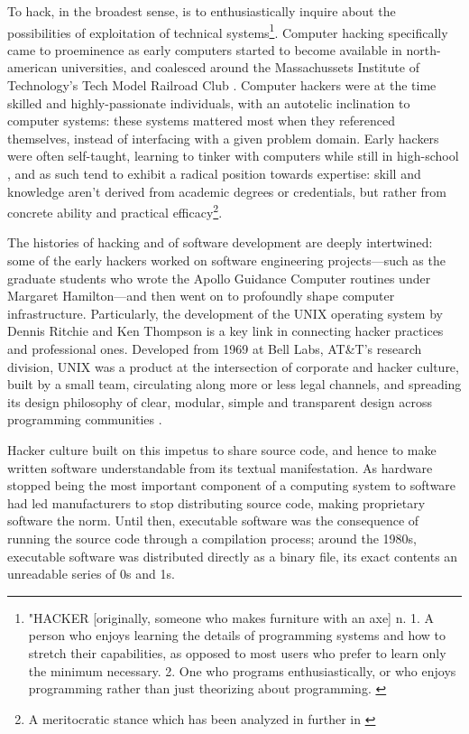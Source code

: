 To hack, in the broadest sense, is to enthusiastically inquire about the possibilities of exploitation of technical systems\footnote{"HACKER [originally, someone who makes furniture with an axe] n. 1. A person who enjoys learning the details of programming systems and how to stretch their capabilities, as opposed to most users who prefer to learn only the minimum necessary. 2. One who programs enthusiastically, or who enjoys programming rather than just theorizing about programming. \citep{dourish_original_1988}}. Computer hacking specifically came to proeminence as early computers started to become available in north-american universities, and coalesced around the Massachussets Institute of Technology's Tech Model Railroad Club \citep{levy_hackers_2010}. Computer hackers were at the time skilled and highly-passionate individuals, with an autotelic inclination to computer systems: these systems mattered most when they referenced themselves, instead of interfacing with a given problem domain. Early hackers were often self-taught, learning to tinker with computers while still in high-school \citep{lammers_programmers_1986}, and as such tend to exhibit a radical position towards expertise: skill and knowledge aren't derived from academic degrees or credentials, but rather from concrete ability and practical efficacy\footnote{A meritocratic stance which has been analyzed in further in  \citep{coleman_aesthetics_2018}}.

The histories of hacking and of software development are deeply intertwined: some of the early hackers worked on software engineering projects—such as the graduate students who wrote the Apollo Guidance Computer routines under Margaret Hamilton—and then went on to profoundly shape computer infrastructure. Particularly, the development of the UNIX operating system by Dennis Ritchie and Ken Thompson is a key link in connecting hacker practices and professional ones. Developed from 1969 at Bell Labs, AT\&T's research division, UNIX was a product at the intersection of corporate and hacker culture, built by a small team, circulating along more or less legal channels, and spreading its design philosophy of clear, modular, simple and transparent design across programming communities \citep{raymond_art_2003}.

Hacker culture built on this impetus to share source code, and hence to make written software understandable from its textual manifestation. As hardware stopped being the most important component of a computing system to software had led manufacturers to stop distributing source code, making proprietary software the norm. Until then, executable software was the consequence of running the source code through a compilation process; around the 1980s, executable software was distributed directly as a binary file, its exact contents an unreadable series of 0s and 1s.

